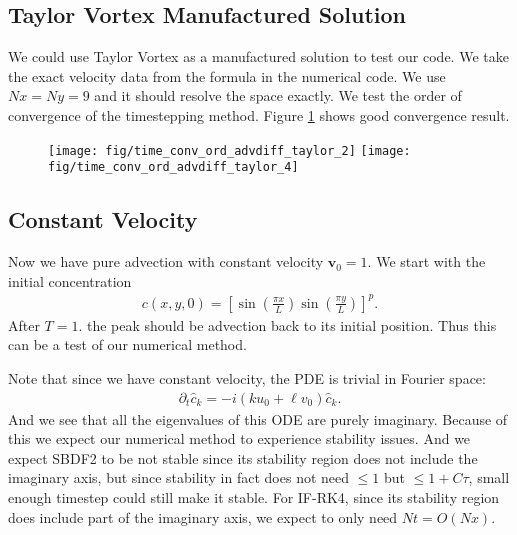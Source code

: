 \documentclass[11pt,letterpaper]{article}
\newcommand{\pe}{\partial}
\newcommand{\ve}[1]{\boldsymbol{#1}}
\begin{document}
\subsection{Taylor Vortex Manufactured Solution}
We could use Taylor Vortex as a manufactured solution to test our code. We take the exact velocity data from the formula in the numerical code. We use $Nx = Ny = 9$ and it should resolve the space exactly. We test the order of convergence of the timestepping method. Figure \ref{fig:time_conv_ord_advdiff_taylor_2} shows good convergence result.
\begin{figure}[H]
    \centering
    \texttt{[image: fig/time\_conv\_ord\_advdiff\_taylor\_2]}
    \texttt{[image: fig/time\_conv\_ord\_advdiff\_taylor\_4]}
    \caption{}\label{fig:time_conv_ord_advdiff_taylor_2}
\end{figure}

\subsection{Constant Velocity}
Now we have pure advection with constant velocity $\ve v_0 = 1$. We start with the initial concentration
\begin{align*}
    c(x,y,0) = \left[ \sin\left(\frac{\pi x}{L}\right)\sin\left(\frac{\pi y}{L}\right) \right]^p.
\end{align*}
After $T = 1$. the peak should be advection back to its initial position. Thus this can be a test of our numerical method. 

Note that since we have constant velocity, the PDE is trivial in Fourier space:
\begin{align*}
    \pe_t\hat c_k = -i(ku_0+\ell v_0)\hat c_k.
\end{align*}
And we see that all the eigenvalues of this ODE are purely imaginary. Because of this we expect our numerical method to experience stability issues. And we expect SBDF2 to be not stable since its stability region does not include the imaginary axis, but since stability in fact does not need $\leq 1$ but $\leq 1+C\tau$, small enough timestep could still make it stable. For IF-RK4, since its stability region does include part of the imaginary axis, we expect to only need $Nt = O(Nx)$.
\end{document}
